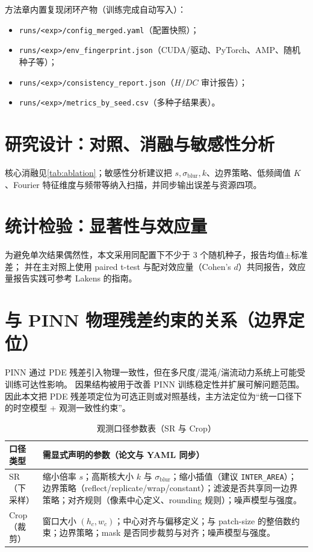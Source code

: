 方法章内置复现闭环产物（训练完成自动写入）：
\begin{itemize}
  \item \texttt{runs/<exp>/config\_merged.yaml}（配置快照）；
  \item \texttt{runs/<exp>/env\_fingerprint.json}（CUDA/驱动、PyTorch、AMP、随机种子等）；
  \item \texttt{runs/<exp>/consistency\_report.json}（$H/DC$ 审计报告）；
  \item \texttt{runs/<exp>/metrics\_by\_seed.csv}（多种子结果表）。
\end{itemize}

\section{研究设计：对照、消融与敏感性分析}
\label{sec:ablation_sensitivity}

核心消融见\autoref{tab:ablation}；敏感性分析建议把 $s,\sigma_{\mathrm{blur}},k$、边界策略、低频阈值 $K$、Fourier 特征维度与频带等纳入扫描，并同步输出误差与资源四项。

\section{统计检验：显著性与效应量}
\label{sec:stats}

为避免单次结果偶然性，本文采用同配置下不少于 3 个随机种子，报告均值$\pm$标准差；
并在主对照上使用 paired t-test 与配对效应量（Cohen's $d$）共同报告，效应量报告实践可参考 Lakens 的指南。

\section{与 PINN 物理残差约束的关系（边界定位）}
\label{sec:pinn_relation}

PINN 通过 PDE 残差引入物理一致性，但在多尺度/混沌/湍流动力系统上可能受训练可达性影响。
因果结构被用于改善 PINN 训练稳定性并扩展可解问题范围。
因此本文把 PDE 残差项定位为可选正则或对照基线，主方法定位为“统一口径下的时空模型 + 观测一致性约束”。

\begin{table}[t]
\centering
\caption{观测口径参数表（SR 与 Crop）}
\label{tab:protocol_table}
\begin{tabular}{@{}p{2.4cm}p{12.2cm}@{}}
\toprule
口径类型 & 需显式声明的参数（论文与 YAML 同步） \\
\midrule
SR（下采样） &
缩小倍率 $s$；高斯核大小 $k$ 与 $\sigma_{\mathrm{blur}}$；缩小插值（建议 \texttt{INTER\_AREA}）；边界策略（reflect/replicate/wrap/constant）；滤波是否共享同一边界策略；对齐规则（像素中心定义、rounding 规则）；噪声模型与强度。 \\
\addlinespace
Crop（裁剪） &
窗口大小 $(h_c,w_c)$；中心对齐与偏移定义；与 patch-size 的整倍数约束；边界策略；mask 是否同步裁剪与对齐；噪声模型与强度。 \\
\bottomrule
\end{tabular}
\end{table}

